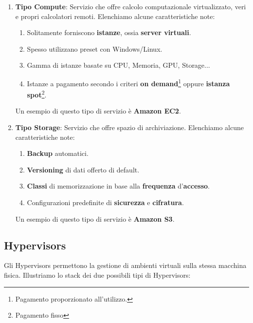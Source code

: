 \documentclass{article}
\begin{document}
\begin{enumerate}
    \item \textbf{Tipo Compute}: Servizio che offre calcolo computazionale virtualizzato, veri e propri calcolatori remoti. Elenchiamo alcune caratteristiche note:
    \begin{enumerate}
        \item Solitamente forniscono \textbf{istanze}, ossia \textbf{server virtuali}.
        \item Spesso utilizzano preset con Windows/Linux.
        \item Gamma di istanze basate su CPU, Memoria, GPU, Storage...
        \item Istanze a pagamento secondo i criteri \textbf{on demand}\footnote{Pagamento proporzionato all'utilizzo.} oppure \textbf{istanza spot}\footnote{Pagamento fisso}.
    \end{enumerate}
    Un esempio di questo tipo di servizio è \textbf{Amazon EC2}.
    \item \textbf{Tipo Storage}: Servizio che offre spazio di archiviazione. Elenchiamo alcune caratteristiche note:
    \begin{enumerate}
        \item \textbf{Backup} automatici.
        \item \textbf{Versioning} di dati offerto di default.
        \item \textbf{Classi} di memorizzazione in base alla \textbf{frequenza} d'\textbf{accesso}.
        \item Configurazioni predefinite di \textbf{sicurezza} e \textbf{cifratura}.
    \end{enumerate}
    Un esempio di questo tipo di servizio è \textbf{Amazon S3}.
\end{enumerate}

\subsection{Hypervisors}

Gli Hypervisors permettono la gestione di ambienti virtuali sulla stessa macchina fisica. Illustriamo lo stack dei due possibili tipi di Hypervisors:
\end{document}
